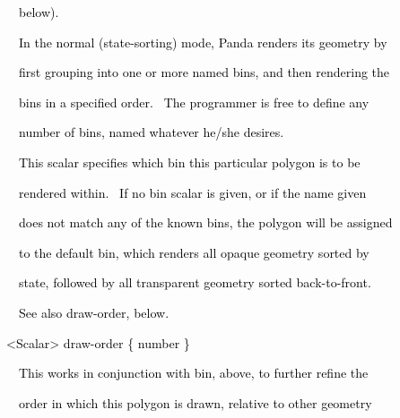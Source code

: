 \documentclass[a4paper]{article}
\newcommand\textstyleOOoComputerKeyWord[1]{\textrm{\textcolor[rgb]{0.0,0.0,0.5019608}{#1}}}
\begin{document}
{\color{black}
\textstyleOOoComputerKeyWord{\textcolor{black}{\ \ \ \ below).}}}

\clearpage
\bigskip


\bigskip

{\color{black}
\textstyleOOoComputerKeyWord{\textcolor{black}{\ \ \ \ In the normal (state-sorting) mode, Panda renders its geometry
by}}}

{\color{black}
\textstyleOOoComputerKeyWord{\textcolor{black}{\ \ \ \ first grouping into one or more named bins, and then rendering
the}}}

{\color{black}
\textstyleOOoComputerKeyWord{\textcolor{black}{\ \ \ \ bins in a specified order. \ The programmer is free to define
any}}}

{\color{black}
\textstyleOOoComputerKeyWord{\textcolor{black}{\ \ \ \ number of bins, named whatever he/she desires.}}}


\bigskip

{\color{black}
\textstyleOOoComputerKeyWord{\textcolor{black}{\ \ \ \ This scalar specifies which bin this particular polygon is to
be}}}

{\color{black}
\textstyleOOoComputerKeyWord{\textcolor{black}{\ \ \ \ rendered within. \ If no bin scalar is given, or if the name
given}}}

{\color{black}
\textstyleOOoComputerKeyWord{\textcolor{black}{\ \ \ \ does not match any of the known bins, the polygon will be
assigned}}}

{\color{black}
\textstyleOOoComputerKeyWord{\textcolor{black}{\ \ \ \ to the default bin, which renders all opaque geometry sorted
by}}}

{\color{black}
\textstyleOOoComputerKeyWord{\textcolor{black}{\ \ \ \ state, followed by all transparent geometry sorted
back-to-front.}}}


\bigskip

{\color{black}
\textstyleOOoComputerKeyWord{\textcolor{black}{\ \ \ \ See also draw-order, below.}}}


\bigskip


\bigskip

{\color{black}
\textstyleOOoComputerKeyWord{\textcolor{black}{\ \ {\textless}Scalar{\textgreater} draw-order \{ number \}}}}


\bigskip

{\color{black}
\textstyleOOoComputerKeyWord{\textcolor{black}{\ \ \ \ This works in conjunction with bin, above, to further refine
the}}}

{\color{black}
\textstyleOOoComputerKeyWord{\textcolor{black}{\ \ \ \ order in which this polygon is drawn, relative to other
geometry}}}
\end{document}
